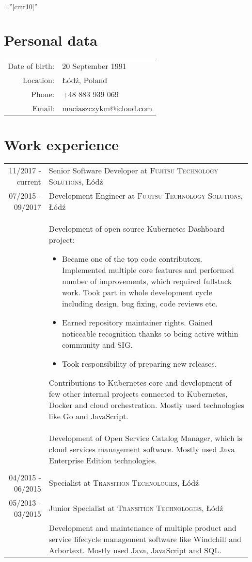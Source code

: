 \documentclass[a4paper,10pt]{article}
\begin{document}
\font\fb=''[cmr10]''
\par{}

\section{Personal data}

\begin{tabular}{rl}
    Date of birth: & 20 September 1991\\
    Location: & Łódź, Poland\\
    Phone: & +48 883 939 069\\
    Email: & maciaszczykm@icloud.com\\
\end{tabular}

\section{Work experience}

\begin{tabular}{r|p{11cm}}

11/2017 - current & Senior Software Developer at \textsc{Fujitsu Technology Solutions}, Łódź \\
07/2015 - 09/2017 & Development Engineer at \textsc{Fujitsu Technology Solutions}, Łódź \\
 & \footnotesize{Development of open-source Kubernetes Dashboard project:
 \begin{itemize}
 	\item Became one of the top code contributors. Implemented multiple core features and performed number of improvements, which required fullstack work. Took part in whole development cycle including design, bug fixing, code reviews etc.
 	\item Earned repository maintainer rights. Gained noticeable recognition thanks to being active within community and SIG.
 	\item Took responsibility of preparing new releases.
 \end{itemize}
 Contributions to Kubernetes core and development of few other internal projects connected to Kubernetes, Docker and cloud orchestration. Mostly used technologies like Go and JavaScript.}\\
 & \footnotesize{Development of Open Service Catalog Manager, which is cloud services management software. Mostly used Java Enterprise Edition technologies.}\\\multicolumn{2}{c}{} \\

04/2015 - 06/2015 & Specialist at \textsc{Transition Technologies}, Łódź \\
05/2013 - 03/2015 & Junior Specialist at \textsc{Transition Technologies}, Łódź \\
 & \footnotesize{Development and maintenance of multiple product and service lifecycle management software like Windchill and Arbortext. Mostly used Java, JavaScript and SQL.}\\

\end{tabular}
\end{document}
